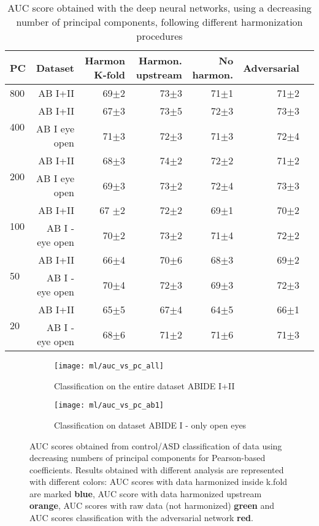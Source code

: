 \documentclass[11pt]{report}
\begin{document}
\begin{table}[!htp]\centering
\scriptsize
\begin{tabular}{lrrrrrr}\toprule
PC &Dataset &Harmon K-fold &Harmon. upstream &No harmon. &Adversarial \\\midrule
800 &AB I+II &69$\pm$2 &73$\pm$3 &71$\pm$1 &71$\pm$2 \\
\hline
\multirow{2}{*}{400} &AB I+II &67$\pm$3 &73$\pm$5 &72$\pm$3 &73$\pm$3 \\
&AB I eye open &71$\pm$3 &72$\pm$3 &71$\pm$3 &72$\pm$4 \\
\hline
\multirow{2}{*}{200} &AB I+II &68$\pm$3 &74$\pm$2 &72$\pm$2 &71$\pm$2 \\
&AB I eye open &69$\pm$3 &73$\pm$2 &72$\pm$4 &73$\pm$3 \\
\hline
\multirow{2}{*}{100} &AB I+II &67 $\pm$2 &72$\pm$2 &69$\pm$1 &70$\pm$2 \\
&AB I - eye open &70$\pm$2 &73$\pm$2 &71$\pm$4 &72$\pm$2 \\
\hline
\multirow{2}{*}{50} &AB I+II &66$\pm$4 &70$\pm$6 &68$\pm$3 &69$\pm$2 \\
&AB I - eye open &70$\pm$4 &72$\pm$3 &69$\pm$3 &72$\pm$3 \\
\hline
\multirow{2}{*}{20} &AB I+II &65$\pm$5 &67$\pm$4 &64$\pm$5 &66$\pm$1 \\
&AB I - eye open &68$\pm$6 &71$\pm$2 &71$\pm$6 &71$\pm$3 \\
\bottomrule
\end{tabular}
\caption{AUC score obtained with the deep neural networks, using a decreasing number of principal components, following different harmonization procedures}
\label{tab:classification_pearson_pca}
\end{table}





\begin{figure}
\centering
\begin{subfigure}{0.4\textwidth}
   \texttt{[image: ml/auc\_vs\_pc\_all]}
   \caption{Classification on the entire dataset ABIDE I+II}
   \label{}
\end{subfigure}
\begin{subfigure}{0.4\textwidth}
   \texttt{[image: ml/auc\_vs\_pc\_ab1]}
   \caption{Classification on dataset ABIDE I - only open eyes}
   \label{}
\end{subfigure}
\caption{AUC scores obtained from control/ASD classification of data using decreasing numbers of principal components for Pearson-based coefficients.
Results obtained with different analysis are represented with different colors: AUC scores with data harmonized inside k.fold are marked \textbf{blue}, AUC score with data harmonized upstream \textbf{orange}, AUC scores with raw data (not harmonized) \textbf{green} and AUC scores classification with the adversarial network \textbf{red}.
}
\label{fig:classification_pearson_pca}
\end{figure}
\end{document}
